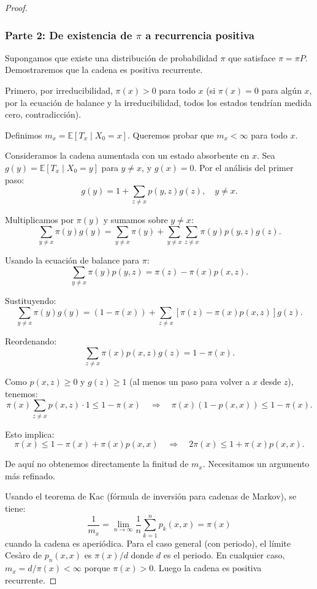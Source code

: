 \documentclass[11pt,a4paper]{article}
\theoremstyle{plain}
\theoremstyle{definition}
\theoremstyle{remark}
\newcommand{\1}{\mathds{1}}
\begin{document}
\begin{proof}
\subsubsection*{Parte 2: De existencia de \(\pi\) a recurrencia positiva}
Supongamos que existe una distribución de probabilidad \(\pi\) que satisface \(\pi = \pi P\). Demostraremos que la cadena es positiva recurrente.

Primero, por irreducibilidad, \(\pi(x) > 0\) para todo \(x\) (si \(\pi(x) = 0\) para algún \(x\), por la ecuación de balance y la irreducibilidad, todos los estados tendrían medida cero, contradicción).

Definimos \(m_x = \mathbb{E}[T_x \mid X_0 = x]\). Queremos probar que \(m_x < \infty\) para todo \(x\).

Consideramos la cadena aumentada con un estado absorbente en \(x\). Sea \(g(y) = \mathbb{E}[T_x \mid X_0 = y]\) para \(y \neq x\), y \(g(x) = 0\). Por el análisis del primer paso:
\[
g(y) = 1 + \sum_{z\neq x} p(y,z) g(z), \quad y \neq x.
\]

Multiplicamos por \(\pi(y)\) y sumamos sobre \(y \neq x\):
\[
\sum_{y\neq x} \pi(y) g(y) = \sum_{y\neq x} \pi(y) + \sum_{y\neq x} \sum_{z\neq x} \pi(y) p(y,z) g(z).
\]

Usando la ecuación de balance para \(\pi\):
\[
\sum_{y\neq x} \pi(y) p(y,z) = \pi(z) - \pi(x) p(x,z).
\]

Sustituyendo:
\[
\sum_{y\neq x} \pi(y) g(y) = (1 - \pi(x)) + \sum_{z\neq x} [\pi(z) - \pi(x) p(x,z)] g(z).
\]

Reordenando:
\[
\sum_{z\neq x} \pi(x) p(x,z) g(z) = 1 - \pi(x).
\]

Como \(p(x,z) \geq 0\) y \(g(z) \geq 1\) (al menos un paso para volver a \(x\) desde \(z\)), tenemos:
\[
\pi(x) \sum_{z\neq x} p(x,z) \cdot 1 \leq 1 - \pi(x) \quad \Rightarrow \quad \pi(x) (1 - p(x,x)) \leq 1 - \pi(x).
\]

Esto implica:
\[
\pi(x) \leq 1 - \pi(x) + \pi(x) p(x,x) \quad \Rightarrow \quad 2\pi(x) \leq 1 + \pi(x) p(x,x).
\]

De aquí no obtenemos directamente la finitud de \(m_x\). Necesitamos un argumento más refinado.

Usando el teorema de Kac (fórmula de inversión para cadenas de Markov), se tiene:
\[
\frac{1}{m_x} = \lim_{n\to\infty} \frac{1}{n} \sum_{k=1}^{n} p_k(x,x) = \pi(x)
\]
cuando la cadena es aperiódica. Para el caso general (con periodo), el límite Cesàro de \(p_n(x,x)\) es \(\pi(x)/d\) donde \(d\) es el periodo. En cualquier caso, \(m_x = d/\pi(x) < \infty\) porque \(\pi(x) > 0\). Luego la cadena es positiva recurrente.


\end{proof}
\end{document}
